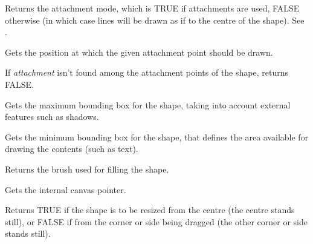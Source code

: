 

Returns the attachment mode, which is TRUE if attachments are used, FALSE otherwise (in which case
lines will be drawn as if to the centre of the shape). See .

\label{wxshapegetattachmentposition}


Gets the position at which the given attachment point should be drawn.

If {\it attachment} isn't found among the attachment points of the shape, returns FALSE.



Gets the maximum bounding box for the shape, taking into
account external features such as shadows.



Gets the minimum bounding box for the shape, that defines
the area available for drawing the contents (such as text).



Returns the brush used for filling the shape.



Gets the internal canvas pointer.



Returns TRUE if the shape is to be resized from the centre (the centre
stands still), or FALSE if from the corner or side being dragged (the
other corner or side stands still).

